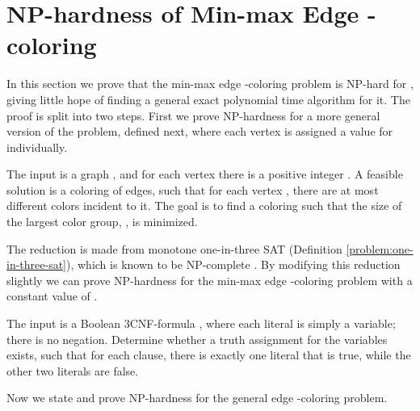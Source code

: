 \documentclass[runningheads, a4paper]{llncs}
\begin{document}
\section{NP-hardness of Min-max Edge -coloring}\label{sect:mmenphard}

In this section we prove that the min-max edge -coloring problem is NP-hard for , giving little hope of finding a general exact polynomial time algorithm for it. The proof is split into two steps. First we prove NP-hardness for a more general version of the problem, defined next, where each vertex is assigned a value for  individually.

\begin{problem}\label{problem:general-mme}

The input is a graph , and for each vertex  there is a positive integer . A feasible solution is a coloring of edges, such that for each vertex , there are at most  different colors incident to it. The goal is to find a coloring  such that the size of the largest color group, , is minimized.
\end{problem}

The reduction is made from monotone one-in-three SAT (Definition \ref{problem:one-in-three-sat}), which is known to be NP-complete \cite{schaefer1978}. By modifying this reduction slightly we can prove NP-hardness for the min-max edge -coloring problem with a constant value of .

\begin{definition}\label{problem:one-in-three-sat}

The input is a Boolean 3CNF-formula , where each literal is simply a variable; there is no negation. Determine whether a truth assignment for the variables exists, such that for each clause, there is exactly one literal that is true, while the other two literals are false.
\end{definition}

Now we state and prove NP-hardness for the general edge -coloring problem.
\end{document}
